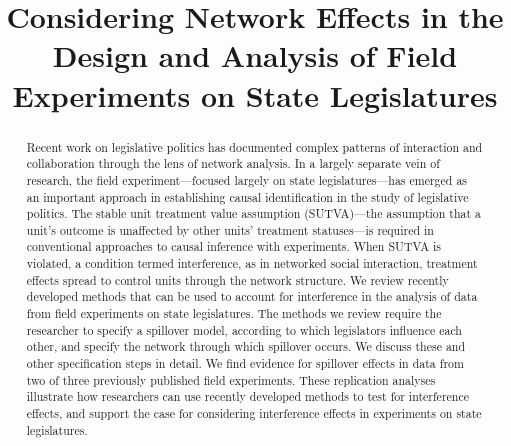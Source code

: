 \documentclass[12pt]{article}
\title{\vspace{-2cm} Considering Network Effects in the Design and Analysis of Field Experiments on State Legislatures }
\begin{document}
\maketitle




\begin{abstract} 
\vspace{.3cm}
\vspace{.3cm}

\noindent  Recent work on legislative politics has documented complex patterns of interaction and collaboration through the lens of network analysis. In a largely separate vein of research, the field experiment---focused largely on state legislatures---has emerged as an important approach in establishing causal identification in the study of legislative politics. The stable unit treatment value assumption (SUTVA)---the assumption that a unit's outcome is unaffected by other units' treatment statuses---is required in conventional approaches to causal inference with experiments. When SUTVA is violated, a condition termed interference, as in networked social interaction, treatment effects spread to control units through the network structure. We review recently developed methods that can be used to account for interference in the analysis of data from field experiments on state legislatures. The methods we review require the researcher to specify a spillover model, according to which legislators influence each other, and specify the network through which spillover occurs. We discuss these and other specification steps in detail. We find evidence for spillover effects in data from two of three previously published field experiments. These replication analyses illustrate how researchers can use recently developed methods to test for interference effects, and support the case for considering interference effects in experiments on state legislatures.%
\\~\\~\\
\end{abstract}
\end{document}
